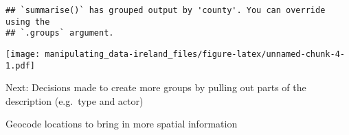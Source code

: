 \documentclass[
]{article}
\begin{document}
\begin{verbatim}
## `summarise()` has grouped output by 'county'. You can override using the
## `.groups` argument.
\end{verbatim}

\texttt{[image: manipulating\_data-ireland\_files/figure-latex/unnamed-chunk-4-1.pdf]}

Next: Decisions made to create more groups by pulling out parts of the
description (e.g.~type and actor)

Geocode locations to bring in more spatial information
\end{document}
